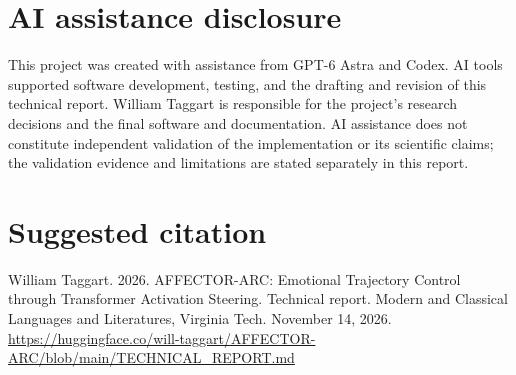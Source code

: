 \documentclass[manuscript,screen,nonacm]{acmart}
\begin{document}
\section*{AI assistance disclosure}
This project was created with assistance from GPT-6 Astra and Codex. AI
tools supported software development, testing, and the drafting and
revision of this technical report. William Taggart is responsible for
the project's research decisions and the final software and
documentation. AI assistance does not constitute independent validation
of the implementation or its scientific claims; the validation evidence
and limitations are stated separately in this report.




\section*{Suggested citation}
William Taggart. 2026. AFFECTOR-ARC: Emotional Trajectory Control
through Transformer Activation Steering. Technical report. Modern and
Classical Languages and Literatures, Virginia Tech. November 14, 2026.
\url{https://huggingface.co/will-taggart/AFFECTOR-ARC/blob/main/TECHNICAL_REPORT.md}
\end{document}

